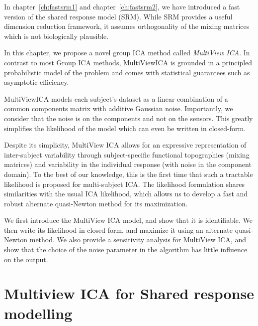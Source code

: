 In chapter~\ref{ch:fastsrm1} and chapter~\ref{ch:fastsrm2}, we have introduced a fast version of the shared
response model (SRM). While SRM provides a useful dimension reduction framework, it assumes orthogonality of the mixing matrices which is not biologically
plausible.

In this chapter, we propose a novel group ICA method called \emph{MultiView ICA}.
In contrast to most Group ICA methods, MultiViewICA is grounded in a principled
probabilistic model of the problem and comes with statistical guarantees such as
asymptotic efficiency.

MultiViewICA models each subject's dataset as a linear combination of a common
components matrix with additive Gaussian noise.
% 
Importantly, we consider that the noise is on the components and not on
the sensors.
% 
This greatly simplifies the likelihood of the model which can even be
written in closed-form.

Despite its simplicity, MultiView ICA allows for an expressive representation of inter-subject variability through subject-specific functional topographies (mixing matrices) and variability in the individual response (with noise in the component domain).
% 
To the best of our knowledge, this is the first time that such a tractable likelihood is proposed for multi-subject ICA.
% 
The likelihood formulation shares similarities with the usual ICA likelihood, which allows us to develop a fast and robust alternate quasi-Newton method for its maximization.

We first introduce the MultiView ICA model, and show that it is identifiable. We then write its likelihood in closed form, and maximize it using an alternate quasi-Newton method.
%
We also provide a sensitivity analysis for MultiView ICA, and show that the choice of the noise parameter in the algorithm has little influence on the output.
\section{Multiview ICA for Shared response modelling}
\label{sec:mvica}
